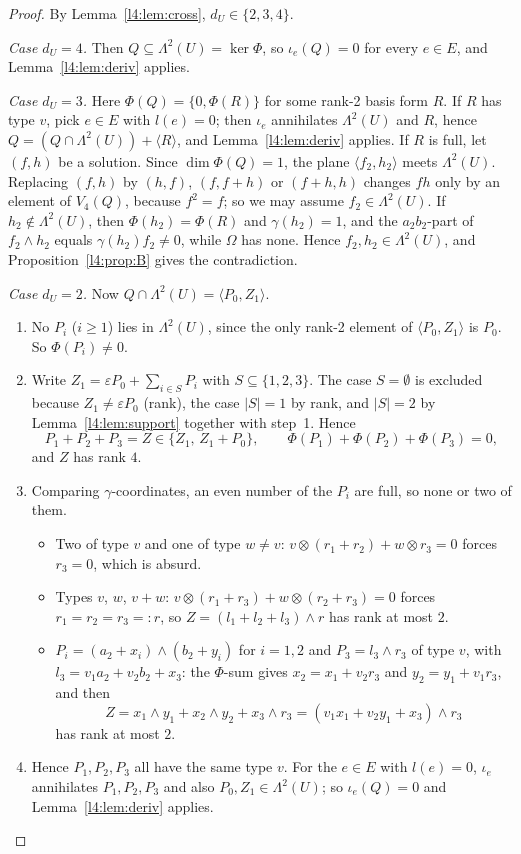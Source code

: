 \documentclass[11pt,a4paper]{article}
\theoremstyle{plain}
\theoremstyle{remark}
\newcommand{\Lam}{\Lambda^2}
\newcommand{\dU}{d_U}
\newcommand{\Dir}{E}
\begin{document}
\begin{proof}
By Lemma~\ref{l4:lem:cross}, $\dU\in\{2,3,4\}$.

\medskip\noindent\emph{Case $\dU=4$.} Then $Q\subseteq\Lam(U)=\ker\Phi$, so $\iota_e(Q)=0$ for every $e\in\Dir$, and Lemma~\ref{l4:lem:deriv} applies.

\medskip\noindent\emph{Case $\dU=3$.} Here $\Phi(Q)=\{0,\Phi(R)\}$ for some rank-2 basis form $R$.
If $R$ has type $v$, pick $e\in\Dir$ with $l(e)=0$; then $\iota_e$ annihilates $\Lam(U)$ and $R$, hence $Q=(Q\cap\Lam(U))+\langle R\rangle$, and Lemma~\ref{l4:lem:deriv} applies.
If $R$ is full, let $(f,h)$ be a solution. Since $\dim\Phi(Q)=1$, the plane $\langle f_2,h_2\rangle$ meets $\Lam(U)$. Replacing $(f,h)$ by $(h,f)$, $(f,f+h)$ or $(f+h,h)$ changes $fh$ only by an element of $V_4(Q)$, because $f^2=f$; so we may assume $f_2\in\Lam(U)$. If $h_2\notin\Lam(U)$, then $\Phi(h_2)=\Phi(R)$ and $\gamma(h_2)=1$, and the $a_2b_2$-part of $f_2\wedge h_2$ equals $\gamma(h_2)f_2\neq0$, while $\Omega$ has none. Hence $f_2,h_2\in\Lam(U)$, and Proposition~\ref{l4:prop:B} gives the contradiction.

\medskip\noindent\emph{Case $\dU=2$.} Now $Q\cap\Lam(U)=\langle P_0,Z_1\rangle$.
\begin{enumerate}[1.]
  \item No $P_i$ ($i\ge1$) lies in $\Lam(U)$, since the only rank-2 element of $\langle P_0,Z_1\rangle$ is $P_0$. So $\Phi(P_i)\neq0$.
  \item Write $Z_1=\varepsilon P_0+\sum_{i\in S}P_i$ with $S\subseteq\{1,2,3\}$. The case $S=\emptyset$ is excluded because $Z_1\ne\varepsilon P_0$ (rank), the case $|S|=1$ by rank, and $|S|=2$ by Lemma~\ref{l4:lem:support} together with step~1. Hence
  \[
    P_1+P_2+P_3=Z\in\{Z_1,\,Z_1+P_0\},\qquad \Phi(P_1)+\Phi(P_2)+\Phi(P_3)=0,
  \]
  and $Z$ has rank $4$.
  \item Comparing $\gamma$-coordinates, an even number of the $P_i$ are full, so none or two of them.
  \begin{itemize}
    \item Two of type $v$ and one of type $w\neq v$: $v\otimes(r_1+r_2)+w\otimes r_3=0$ forces $r_3=0$, which is absurd.
    \item Types $v$, $w$, $v+w$: $v\otimes(r_1+r_3)+w\otimes(r_2+r_3)=0$ forces $r_1=r_2=r_3=:r$, so $Z=(l_1+l_2+l_3)\wedge r$ has rank at most $2$.
    \item $P_i=(a_2+x_i)\wedge(b_2+y_i)$ for $i=1,2$ and $P_3=l_3\wedge r_3$ of type $v$, with $l_3=v_1a_2+v_2b_2+x_3$: the $\Phi$-sum gives $x_2=x_1+v_2r_3$ and $y_2=y_1+v_1r_3$, and then
    \[
      Z=x_1\wedge y_1+x_2\wedge y_2+x_3\wedge r_3=(v_1x_1+v_2y_1+x_3)\wedge r_3
    \]
    has rank at most $2$.
  \end{itemize}
  \item Hence $P_1,P_2,P_3$ all have the same type $v$. For the $e\in\Dir$ with $l(e)=0$, $\iota_e$ annihilates $P_1,P_2,P_3$ and also $P_0,Z_1\in\Lam(U)$; so $\iota_e(Q)=0$ and Lemma~\ref{l4:lem:deriv} applies.\qedhere
\end{enumerate}
\end{proof}
\end{document}
